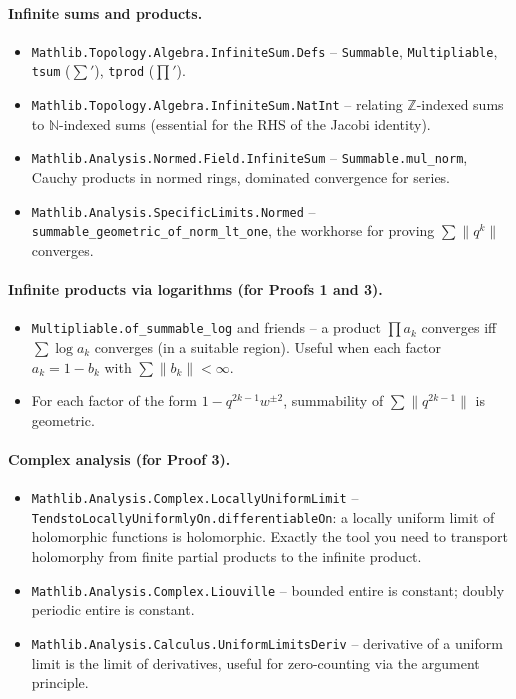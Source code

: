 \paragraph{Infinite sums and products.}
\begin{itemize}\item \texttt{Mathlib.Topology.Algebra.InfiniteSum.Defs} -- \texttt{Summable}, \texttt{Multipliable}, \texttt{tsum} ($\sum'$), \texttt{tprod} ($\prod'$).
\item \texttt{Mathlib.Topology.Algebra.InfiniteSum.NatInt} -- relating $\mathbb{Z}$-indexed sums to $\mathbb{N}$-indexed sums (essential for the RHS of the Jacobi identity).
\item \texttt{Mathlib.Analysis.Normed.Field.InfiniteSum} -- \texttt{Summable.mul\_norm}, Cauchy products in normed rings, dominated convergence for series.
\item \texttt{Mathlib.Analysis.SpecificLimits.Normed} -- \texttt{summable\_geometric\_of\_norm\_lt\_one}, the workhorse for proving $\sum \|q^k\|$ converges.
\end{itemize}

\paragraph{Infinite products via logarithms (for Proofs 1 and 3).}
\begin{itemize}\item \texttt{Multipliable.of\_summable\_log} and friends -- a product $\prod a_k$ converges iff $\sum \log a_k$ converges (in a suitable region). Useful when each factor $a_k = 1 - b_k$ with $\sum \|b_k\| < \infty$.
\item For each factor of the form $1 - q^{2k-1} w^{\pm 2}$, summability of $\sum \|q^{2k-1}\|$ is geometric.
\end{itemize}

\paragraph{Complex analysis (for Proof 3).}
\begin{itemize}\item \texttt{Mathlib.Analysis.Complex.LocallyUniformLimit} -- \texttt{TendstoLocallyUniformlyOn.differentiableOn}: a locally uniform limit of holomorphic functions is holomorphic. Exactly the tool you need to transport holomorphy from finite partial products to the infinite product.
\item \texttt{Mathlib.Analysis.Complex.Liouville} -- bounded entire is constant; doubly periodic entire is constant.
\item \texttt{Mathlib.Analysis.Calculus.UniformLimitsDeriv} -- derivative of a uniform limit is the limit of derivatives, useful for zero-counting via the argument principle.
\end{itemize}

